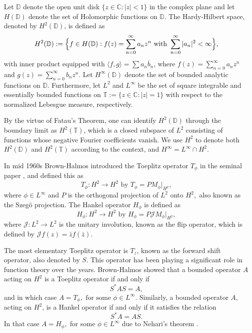 \documentclass[12pt, reqno]{amsart}
\theoremstyle{definition}
\theoremstyle{remark}
\numberwithin{equation}{section}
\newcommand{\li}{L^\infty}
\begin{document}
    
     Let $\mathbb{D}$ denote the open unit disk $\{ z \in \mathbb{C}: |z| < 1 \}$ in the complex plane and let $H(\mathbb{D})$ denote the set of Holomorphic functions on $\mathbb{D}$. 
     The Hardy-Hilbert space, denoted by $H^2(\mathbb{D})$, 
     is defined as
    $$ H^2(\mathbb{D}):=\Bigl\{f\in H(\mathbb{D}): f(z)=\sum_{n=0}^{\infty}a_nz^n \text{ with } \sum_{n=0}^{\infty} |a_n|^2 <  \infty \Bigr\}, $$
    with inner product equipped with $\langle f,g\rangle=\sum a_n \overline b_n$, where $f(z)=\sum_{n=0}^{\infty}a_nz^n$  and  $g(z)=\sum_{n=0}^{\infty}b_nz^n$. 
    Let $H^\infty(\mathbb{D})$ denote the set of bounded analytic functions on $\mathbb{D}$. Furthermore, let $L^2$ and $L^\infty$ be the set of square integrable and essentially bounded functions on $\mathbb{T}:=\{ z \in \mathbb{C}: |z|=1 \}$ with respect to the normalized Lebesgue measure, respectively.
    
   
    
    By the virtue of Fatau's Theorem, one can identify $H^2(\mathbb{D})$ through the boundary limit as $H^2(\mathbb{T})$, which is a closed subspace of $L^2$ consisting of functions whose negative Fourier coefficients vanish. We use $H^2$ to denote both $H^2(\mathbb{D})$ and $H^2(\mathbb{T})$ according to the context, and $H^\infty = L^\infty \cap H^2$.
    
    In mid 1960s Brown-Halmos introduced the Toeplitz operator $T_\phi$ in the seminal paper \cite{BH}, and defined this as $$T_\phi:H^2\rightarrow H^2 \text{ by } T_{\phi}=PM_\phi|_{H^2}
    ,$$ where $\phi \in L^\infty$ and $P$ is the orthogonal projection of $L^2$ onto $H^2,$ also known as the Szeg\"o projection. The Hankel operator $H_\phi$ is defined as $$ H_\phi: H^2 \rightarrow H^2 \text{ by } H_\phi = P\mathcal{J}M_\phi|_{H^2}, $$ where $\mathcal{J}: L^2\rightarrow L^2$ is the unitary involution, known as the flip operator, which is defined by $\mathcal{J}f(z)=\bar{z}f(\bar{z})$.

    The most elementary Toeplitz operator is $T_z$, known as the forward shift operator, also denoted by $S$. This operator has been playing a significant role in function theory over the years. Brown-Halmos showed that a bounded operator $A$ acting on $H^2$ is a Toeplitz operator if and only if 
    $$ S^*AS=A,$$
    and in which case $ A=T_\phi, \text{ for some } \phi\in \li.$ Similarly, a bounded operator $A$, acting on $H^2$, is a Hankel operator if and only if it satisfies the relation 
    $$S^*A=AS.$$
    In that case $A=H_\phi,$ for some $\phi\in L^\infty$ due to Nehari's theorem \cite{ZN}.
\end{document}
